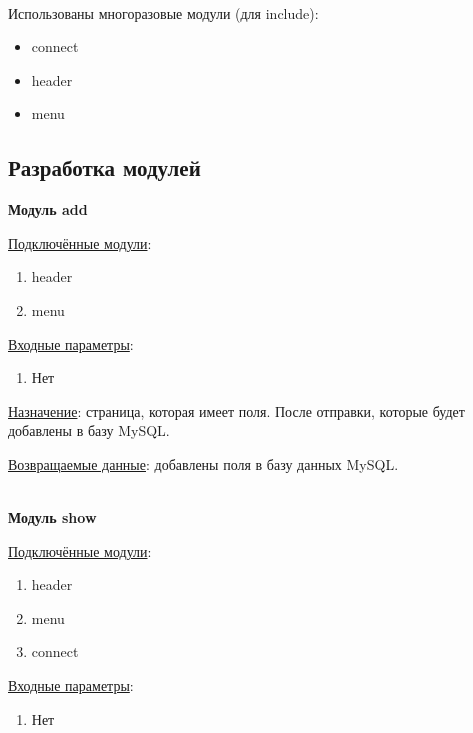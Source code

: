 \hspace{0pt}\\

Использованы многоразовые модули (для include): 

\begin{itemize}
    \item connect
    \item header
    \item menu
\end{itemize}

\newpage

\subsection{Разработка модулей}

\textbf{Модуль add}

\underline{Подключённые модули}:

\begin{enumerate}
    \item header
    \item menu
\end{enumerate}

\underline{Входные параметры}:

\begin{enumerate}
    \item Нет
\end{enumerate}

\underline{Назначение}: страница, которая имеет поля. После отправки, которые будет добавлены в базу MySQL.

\underline{Возвращаемые данные}: добавлены поля в базу данных MySQL.

\hspace{0pt}\\


\textbf{Модуль show}

\underline{Подключённые модули}:

\begin{enumerate}
    \item header
    \item menu
    \item connect
\end{enumerate}

\underline{Входные параметры}:

\begin{enumerate}
    \item Нет
\end{enumerate}

